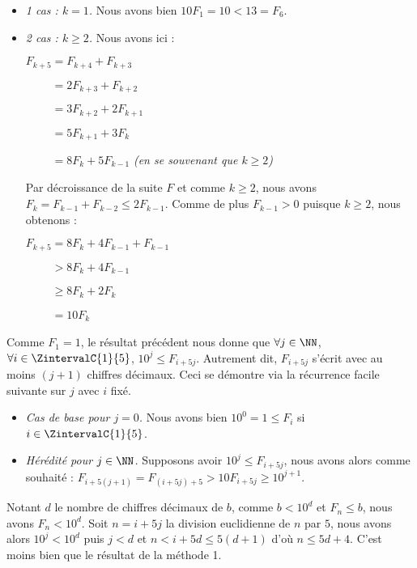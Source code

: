 \begin{itemize}[label=\small\textbullet]
	\item \emph{1\ier{} cas : $k = 1$.}
	Nous avons bien $10 F_1 = 10 < 13 = F_6$.
	
	
	\item \emph{2\ieme{} cas : $k \geq 2$.}
	Nous avons ici :
	
	\noindent
	$F_{k + 5} = F_{k + 4} + F_{k + 3}$
	
	\noindent
	$\phantom{F_{k + 5}} = 2 F_{k + 3} + F_{k + 2}$

	\noindent
	$\phantom{F_{k + 5}} = 3 F_{k + 2} + 2 F_{k + 1}$

	\noindent
	$\phantom{F_{k + 5}} = 5 F_{k + 1} + 3 F_k$

	\noindent
	$\phantom{F_{k + 5}} = 8 F_k + 5 F_{k - 1}$ \quad \emph{\small(en se souvenant que $k \geq 2$)}
	
	\noindent
	Par décroissance de la suite $F$ et comme $k \geq 2$, nous avons $F_k = F_{k - 1} + F_{k - 2} \leq 2 F_{k - 1}$.
	Comme de plus $F_{k - 1} > 0$ puisque $k \geq 2$, nous obtenons :

	\noindent
	$F_{k + 5} = 8 F_k + 4 F_{k - 1} + F_{k - 1}$

	\noindent
	$\phantom{F_{k + 5}} > 8 F_k + 4 F_{k - 1}$

	\noindent
	$\phantom{F_{k + 5}} \geq 8 F_k + 2 F_k$

	\noindent
	$\phantom{F_{k + 5}} = 10 F_k$
\end{itemize}


Comme $F_1 = 1$, le résultat précédent nous donne que $\forall j \in \NN$, $\forall i \in \ZintervalC{1}{5}$, $10^j \leq F_{i + 5j}$.
Autrement dit, $F_{i + 5j}$ s'écrit avec au moins $(j + 1)$ chiffres décimaux.
Ceci se démontre via la récurrence facile suivante sur $j$ avec $i$ fixé.

\begin{itemize}[label=\small\textbullet]
	\item \emph{Cas de base pour $j = 0$.}
		  Nous avons bien $10^0 = 1 \leq F_{i}$ si $i \in \ZintervalC{1}{5}$.
	
	
	\item \emph{Hérédité pour $j \in \NN$.} 
		  Supposons avoir $10^j \leq F_{i + 5j}$, nous avons alors comme souhaité :
		  $F_{i + 5(j+1)} = F_{(i + 5j) + 5} > 10 F_{i + 5j} \geq 10^{j+1}$.
\end{itemize}


Notant $d$ le nombre de chiffres décimaux de $b$, comme $b < 10^d$ et $F_n \leq b$, nous avons $F_n < 10^d$.
Soit $n = i + 5j$ la division euclidienne de $n$ par $5$, nous avons alors $10^j < 10^d$ puis $j < d$ et $n < i + 5d \leq 5(d+1)$ d'où $n \leq 5d + 4$. C'est moins bien que le résultat de la méthode 1.


